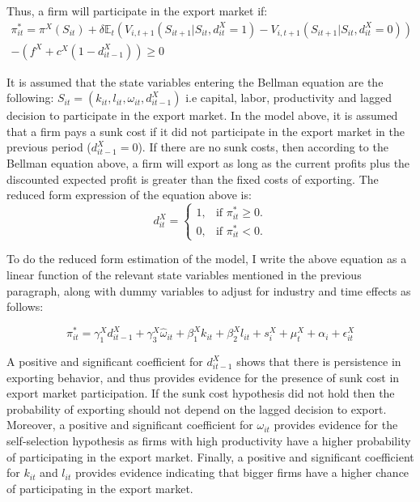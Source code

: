 \documentclass[12pt]{article}
\begin{document}
 Thus, a firm will participate in the export market if:
\begin{equation}
\begin{aligned}
\pi_{it}^{*} = \pi^{X}(S_{it})  +
\delta \mathbb{E}_{t}(V_{i,t+1}(S_{it+1}|S_{it},d_{it}^{X}=1) -
V_{i,t+1}(S_{it+1}|S_{it},d_{it}^{X}=0))\\ 
-  (f^{X} +
c^{X}(1-d_{it-1}^{X})) \geq 0
\end{aligned}
\end{equation}

It is assumed that the state variables entering the Bellman equation
are the following: $S_{it}= (k_{it}, l_{it}, \omega_{it},
d_{it-1}^{X})$ i.e capital, labor, productivity and lagged decision to
participate in the export market. In the model above, it is assumed
that a firm pays a sunk cost if it did not participate in the export
market in the previous period  ($d_{it-1}^{X} = 0$).  If there are no sunk costs, then
according to the Bellman equation above, a firm will export as long as
the current profits plus the discounted expected profit is greater
than the fixed costs of exporting. 
The reduced form expression of the equation above is: 
\begin{equation}
  d_{it}^{X}=\begin{cases}
   1 , & \text{if $\pi_{it}^{*} \geq 0$}.\\
   0 , & \text{if $\pi_{it}^{*}<  0$}.
  \end{cases}
\end{equation}

To do the reduced form estimation of the model, I write the above equation as a linear
function of the relevant state variables mentioned in the previous
paragraph, along with dummy variables to
adjust for industry and time effects as follows:

\begin{equation}
\label{eq:export}
  \pi_{it}^{*}=   \gamma_{1}^{X} d_{it-1}^{X} + 
\gamma_{3}^{X} \hat{\omega}_{it}  + \beta_{1}^{X}k_{it}  +\beta_{2}^{X}l_{it}+
s_{i}^{X} + \mu_{t}^{X}  + \alpha_{i}+ \epsilon_{it}^{X}
\end{equation}


A positive and significant coefficient for $d_{it-1}^{X}$ shows that there is
persistence in exporting behavior, and thus provides
evidence for the presence of sunk cost in export market participation.
If the sunk cost hypothesis did not hold then the probability of exporting
should not depend on the lagged decision to export. Moreover, a positive and significant
coefficient for $\omega_{it}$  provides evidence for the
self-selection hypothesis as firms with high
productivity have a higher probability of participating  in the export
market. Finally, a positive and significant coefficient for $k_{it}$
and $l_{it}$ provides evidence indicating that bigger firms have a
higher chance of participating in the export market. 
\end{document}
